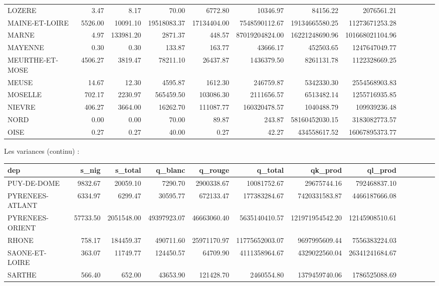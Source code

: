 \documentclass[11pt, a4paper]{article}
\begin{document}
\begin{landscape}
\begin{tabular}{lrrrrrrrrrrrr}
    LOZERE & 3.47 & 8.17 & 70.00 & 6772.80 & 10346.97 & 84156.22 & 2076561.21 \\ 
    MAINE-ET-LOIRE & 5526.00 & 10091.10 & 19518083.37 & 17134404.00 & 7548590112.67 & 19134665580.25 & 11273671253.28 \\ 
    MARNE & 4.97 & 133981.20 & 2871.37 & 448.57 & 87019204824.00 & 16221248690.96 & 101668021104.96 \\ 
    MAYENNE & 0.30 & 0.30 & 133.87 & 163.77 & 43666.17 & 452503.65 & 1247647049.77 \\ 
    MEURTHE-ET-MOSE & 4506.27 & 3819.47 & 78211.10 & 26437.87 & 1436379.50 & 8261131.78 & 1122328669.25 \\ 
    MEUSE & 14.67 & 12.30 & 4595.87 & 1612.30 & 246759.87 & 5342330.30 & 2554568903.83 \\ 
    MOSELLE & 702.17 & 2230.97 & 565459.50 & 103086.30 & 2111656.57 & 6513482.14 & 1255716935.85 \\ 
    NIEVRE & 406.27 & 3664.00 & 16262.70 & 111087.77 & 160320478.57 & 1040488.79 & 109939236.48 \\ 
    NORD & 0.00 & 0.00 & 70.00 & 89.87 & 243.87 & 58160452030.15 & 3183082773.57 \\ 
    OISE & 0.27 & 0.27 & 40.00 & 0.27 & 42.27 & 434558617.52 & 16067895373.77 \\ 
    \hline
\end{tabular}
\FloatBarrier
\newpage
Les variances (continu) :
\FloatBarrier
\begin{tabular}{lrrrrrrrrrrrr}
    \hline
    dep & s\_nig & s\_total & q\_blanc & q\_rouge & q\_total & qk\_prod & ql\_prod \\ 
    \hline
    PUY-DE-DOME & 9832.67 & 20059.10 & 7290.70 & 2900338.67 & 10081752.67 & 29675744.16 & 792468837.10 \\ 
    PYRENEES-ATLANT & 6334.97 & 6299.47 & 30595.77 & 672133.47 & 177383284.67 & 7420331583.87 & 4466187666.08 \\ 
    PYRENEES-ORIENT & 57733.50 & 2051548.00 & 49397923.07 & 46663060.40 & 5635140410.57 & 121971954542.20 & 12145908510.61 \\ 
    RHONE & 758.17 & 184459.37 & 490711.60 & 25971170.97 & 11775652003.07 & 9697995609.44 & 7556383224.03 \\ 
    SAONE-ET-LOIRE & 363.07 & 11749.77 & 124450.57 & 64709.90 & 4111358964.67 & 4329022560.04 & 26341241684.67 \\ 
    SARTHE & 566.40 & 652.00 & 43653.90 & 121428.70 & 2460554.80 & 1379459740.06 & 1786525088.69 \\ 

\end{tabular}
\end{landscape}
\end{document}

